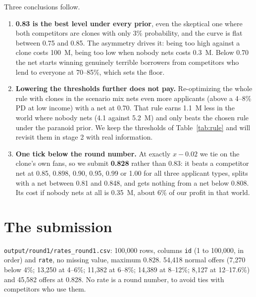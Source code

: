 \documentclass[11pt,a4paper]{article}
\newcommand{\meur}{M\texteuro}
\newcommand{\code}[1]{\texttt{#1}}
\begin{document}
Three conclusions follow.
\begin{enumerate}
  \item \textbf{0.83 is the best level under every prior}, even the skeptical one where both competitors are
        clones with only 3\% probability, and the curve is flat between 0.75 and 0.85. The asymmetry drives it:
        being too high against a clone costs 100~\meur{}, being too low when nobody nets costs 0.3~\meur{}.
        Below 0.70 the net starts winning genuinely terrible borrowers from competitors who lend to everyone at
        70--85\%, which sets the floor.
  \item \textbf{Lowering the thresholds further does not pay.} Re-optimizing the whole rule with clones in the
        scenario mix nets even more applicants (above a 4--8\% PD at low income) with a net at 0.70. That rule
        earns 1.1~\meur{} less in the world where nobody nets (4.1 against 5.2~\meur{}) and only beats the chosen
        rule under the paranoid prior. We keep the thresholds of Table~\ref{tab:rule} and will revisit them in
        stage 2 with real information.
  \item \textbf{One tick below the round number.} At exactly $x - 0.02$ we tie on the clone's own fans, so we
        submit \textbf{0.828} rather than 0.83: it beats a competitor net at 0.85, 0.898, 0.90, 0.95, 0.99 or 1.00
        for all three applicant types, splits with a net between 0.81 and 0.848, and gets nothing from a net
        below 0.808. Its cost if nobody nets at all is 0.35~\meur{}, about 6\% of our profit in that world.
\end{enumerate}

\section{The submission}
\code{output/round1/rates\_round1.csv}: 100,000 rows, columns \code{id} (1 to 100,000, in order) and \code{rate},
no missing value, maximum 0.828. 54,418 normal offers (7,270 below 4\%; 13,250 at 4--6\%; 11,382 at 6--8\%;
14,389 at 8--12\%; 8,127 at 12--17.6\%) and 45,582 offers at 0.828. No rate is a round number, to avoid ties with
competitors who use them.
\end{document}
